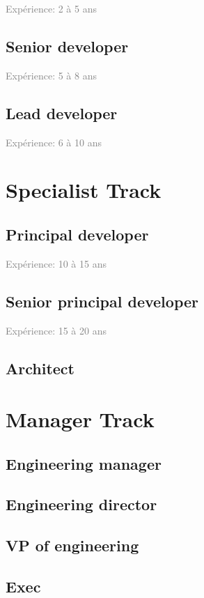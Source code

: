 \documentclass[a4paper, french, openany, 12pt]{book}
\newcommand\xp[1]{\textcolor{Gray}{Expérience: {#1} ans}}
\begin{document}
\xp{2 à 5}

\chapter{Senior developer}

\xp{5 à 8}

\chapter{Lead developer}

\xp{6 à 10}

\part{Specialist Track}

\chapter{Principal developer}

\xp{10 à 15}

\chapter{Senior principal developer}

\xp{15 à 20}

\chapter{Architect}

\part{Manager Track}

\chapter{Engineering manager}

\chapter{Engineering director}

\chapter{VP of engineering}

\chapter{Exec}

\backmatter

\tableofcontents
\end{document}
